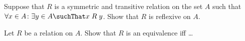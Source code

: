 \begin{Exercise} [number=73]
  Suppose that $R$ is a symmetric and transitive relation on the set
  $A$ such that $\forall{x \in A} \colon \exists{y \in A} \suchThat
  x\mathrel{R}y$. Show that $R$ is reflexive on $A$.
\end{Exercise}

\begin{Exercise} [number=74]
  Let $R$ be a relation on $A$. Show that $R$ is an equivalence iff
  \dots %
\end{Exercise}
